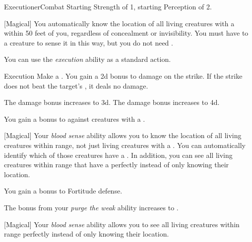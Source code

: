     \begin{feat}{Executioner}{Combat}
        \featpres Starting Strength of 1, starting Perception of 2.

        [Magical] You automatically know the location of all living creatures with a  within 50 feet of you, regardless of concealment or invisibility.
        You must have  to a creature to sense it in this way, but you do not need .

         You can use the \textit{execution} ability as a standard action.
        \begin{freeability}{Execution}
            Make a .
            You gain a \plus2d bonus to damage on the strike.
            If the strike does not beat the target's , it deals no damage.

            \rankline
             The damage bonus increases to \plus3d.
             The damage bonus increases to \plus4d.
        \end{freeability}

         You gain a  bonus to  against creatures with a .

        [Magical] Your \textit{blood sense} ability allows you to know the location of all living creatures within range, not just living creatures with a .
        You can automatically identify which of those creatures have a .
        In addition, you can see all living creatures within range that have a  perfectly instead of only knowing their location.

         You gain a  bonus to Fortitude defense.

         The bonus from your \textit{purge the weak} ability increases to .

        [Magical] Your \textit{blood sense} ability allows you to see all living creatures within range perfectly instead of only knowing their location.
    \end{feat}


